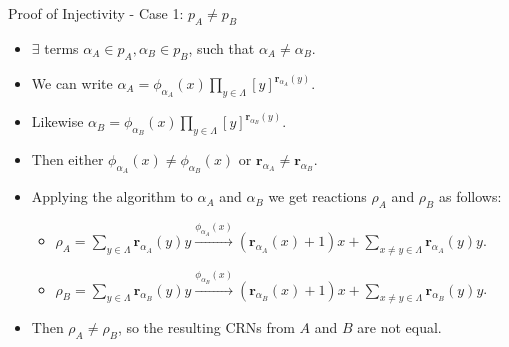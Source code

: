 \begin{frame}{Proof of Injectivity - Case 1: $p_{A} \neq p_{B}$}
\begin{itemize}
\item $\exists$ terms $\alpha_{A} \in p_{A}, \alpha_{B} \in p_{B}$, such that $\alpha_{A} \neq \alpha_{B}$.
\item We can write $\alpha_{A} = \phi_{\alpha_{A}}(x) \prod\limits_{y \in \Lambda} \left[ y \right]^{\textbf{r}_{\alpha_{A}}(y)}$.
\item Likewise $\alpha_{B} = \phi_{\alpha_{B}}(x) \prod\limits_{y \in \Lambda} \left[ y \right]^{\textbf{r}_{\alpha_{B}}(y)}$.
\item Then either $\phi_{\alpha_{A}}(x) \neq \phi_{\alpha_{B}}(x)$ or $\textbf{r}_{\alpha_{A}} \neq \textbf{r}_{\alpha_{B}}$.
\item Applying the algorithm to $\alpha_{A}$ and $\alpha_{B}$ we get reactions $\rho_{A}$ and $\rho_{B}$ as follows:
	\begin{itemize}
	\item $\rho_{A} = \sum\limits_{y \in \Lambda} \textbf{r}_{\alpha_{A}}(y) y \xrightarrow{\phi_{\alpha_{A}}(x)}
		  (\textbf{r}_{\alpha_{A}}(x) + 1) x + \sum\limits_{x \neq y \in \Lambda} \textbf{r}_{\alpha_{A}}(y) y$.
    \item $\rho_{B} = \sum\limits_{y \in \Lambda} \textbf{r}_{\alpha_{B}}(y) y \xrightarrow{\phi_{\alpha_{B}}(x)}
		  (\textbf{r}_{\alpha_{B}}(x) + 1) x + \sum\limits_{x \neq y \in \Lambda} \textbf{r}_{\alpha_{B}}(y) y$.
	\end{itemize}
\item Then $\rho_{A} \neq \rho_{B}$, so the resulting CRNs from $A$ and $B$ are not equal.
\end{itemize}
\end{frame}
